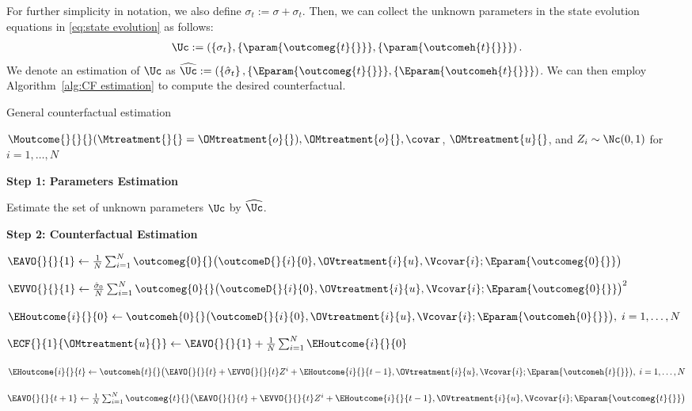 For further simplicity in notation, we also define $\sigma_t := \sigma + \sigma_t$. Then, we can collect the unknown parameters in the state evolution equations in \eqref{eq:state evolution} as follows:
%
\begin{align}
    \label{eq:apndx_unknowns}
    \Uc := \left(\{\sigma_t\}, \{\param{\outcomeg{t}{}} \}, \{\param{\outcomeh{t}{}}\}\right).
\end{align}
%
We denote an estimation of $\Uc$ as $\widehat{\Uc} := \left(\left\{\hat{\sigma}_t\right\}, \{\Eparam{\outcomeg{t}{}}\}, \{\Eparam{\outcomeh{t}{}}\}\right)$. We can then employ Algorithm~\ref{alg:CF estimation} to compute the desired counterfactual.
% 
\begin{algorithm}
\caption{General counterfactual estimation}
\label{alg:CF estimation}
% 
\begin{algorithmic}
% 
\Require $\Moutcome{}{}{}(\Mtreatment{}{}=\OMtreatment{o}{}), \OMtreatment{o}{}, \covar$, $\OMtreatment{u}{}$, and $Z_i \sim \Nc(0,1)$ for $i=1, \ldots, N$

\State \hspace{-1.3em} \textbf{Step 1: Parameters Estimation}

\State Estimate the set of unknown parameters $\Uc$ by $\widehat{\Uc}$.


\State \hspace{-1.3em} \textbf{Step 2: Counterfactual Estimation}



\State $\EAVO{}{}{1} \gets \frac{1}{N} \sum_{i=1}^N \outcomeg{0}{}\big(\outcomeD{}{i}{0}, \OVtreatment{i}{u}, \Vcovar{i}; \Eparam{\outcomeg{0}{}} \big)$ 

\State $\EVVO{}{}{1} \gets \frac{\hat{\sigma}_0}{N} \sum_{i=1}^N \outcomeg{0}{}\big(\outcomeD{}{i}{0}, \OVtreatment{i}{u}, \Vcovar{i}; \Eparam{\outcomeg{0}{}}\big)^2$

\State $\EHoutcome{i}{}{0} \gets \outcomeh{0}{}\big(\outcomeD{}{i}{0}, \OVtreatment{i}{u}, \Vcovar{i}; \Eparam{\outcomeh{0}{}}\big),\; i = 1, \ldots, N$ 

\State $\ECF{}{1}{\OMtreatment{u}{}} \gets \EAVO{}{}{1} + \frac{1}{N} \sum_{i=1}^N \EHoutcome{i}{}{0}$


\State $\EHoutcome{i}{}{t} \gets \outcomeh{t}{}\big(\EAVO{}{}{t} + \EVVO{}{}{t} Z^i + \EHoutcome{i}{}{t-1}, \OVtreatment{i}{u}, \Vcovar{i}; \Eparam{\outcomeh{t}{}}\big),\; i = 1, \ldots, N$

\State $\EAVO{}{}{t+1} \gets \frac{1}{N} \sum_{i=1}^N \outcomeg{t}{}\big(\EAVO{}{}{t} + \EVVO{}{}{t} Z^i + \EHoutcome{i}{}{t-1}, \OVtreatment{i}{u}, \Vcovar{i}; \Eparam{\outcomeg{t}{}}\big)$


\end{algorithmic}
\end{algorithm}
